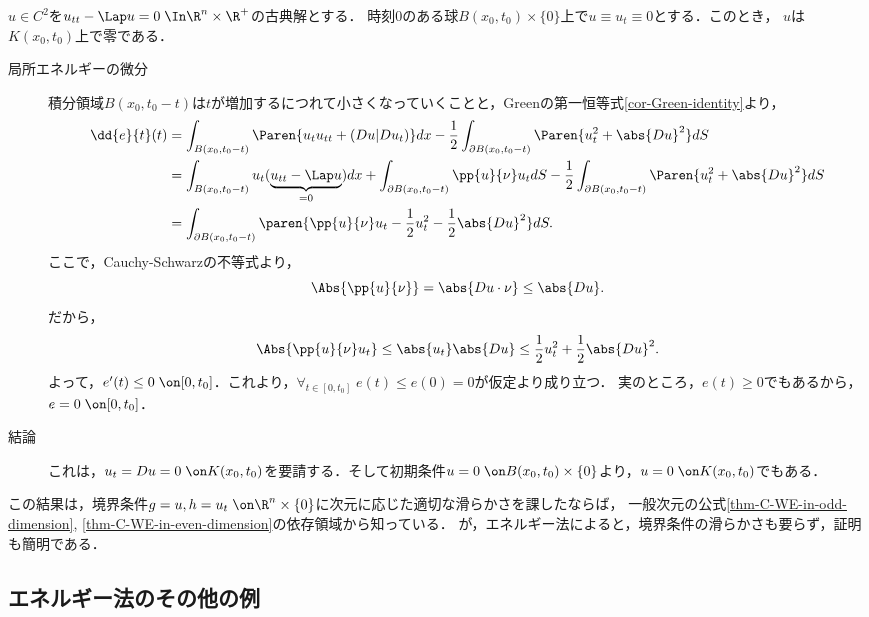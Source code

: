 \documentclass[uplatex,dvipdfmx]{jsreport}
\begin{document}
\begin{theorem}[波動方程式の解の有限伝播速度]
    $u\in C^2$を$u_{tt}-\Lap u=0\;\In \R^n\times\R^+$の古典解とする．
    時刻$0$のある球$B(x_0,t_0)\times\{0\}$上で$u\equiv u_t\equiv 0$とする．このとき，
    $u$は$K(x_0,t_0)$上で零である．
\end{theorem}
\begin{Proof}\mbox{}
    \begin{description}
        \item[局所エネルギーの微分] 積分領域$B(x_0,t_0-t)$は$t$が増加するにつれて小さくなっていくことと，Greenの第一恒等式\ref{cor-Green-identity}より，
        \begin{align*}
            \dd{e}{t}(t)&=\int_{B(x_0,t_0-t)}\Paren{u_tu_{tt}+(Du|Du_t)}dx-\frac{1}{2}\int_{\partial B(x_0,t_0-t)}\Paren{u_t^2+\abs{Du}^2}dS\\
            &=\int_{B(x_0,t_0-t)}u_t(\underbrace{u_{tt}-\Lap u}_{=0})dx+\int_{\partial B(x_0,t_0-t)}\pp{u}{\nu}u_tdS-\frac{1}{2}\int_{\partial B(x_0,t_0-t)}\Paren{u_t^2+\abs{Du}^2}dS\\
            &=\int_{\partial B(x_0,t_0-t)}\paren{\pp{u}{\nu}u_t-\frac{1}{2}u_t^2-\frac{1}{2}\abs{Du}^2}dS.
        \end{align*}
        ここで，Cauchy-Schwarzの不等式より，
        \[\Abs{\pp{u}{\nu}}=\abs{Du\cdot \nu}\le\abs{Du}.\]
        だから，
        \[\Abs{\pp{u}{\nu}u_t}\le\abs{u_t}\abs{Du}\le\frac{1}{2}u_t^2+\frac{1}{2}\abs{Du}^2.\]
        よって，$e'(t)\le0\;\on[0,t_0]$．これより，$\forall_{t\in[0,t_0]}\;e(t)\le e(0)=0$が仮定より成り立つ．
        実のところ，$e(t)\ge0$でもあるから，$e=0\;\on[0,t_0]$．
        \item[結論] これは，$u_t=Du=0\;\on K(x_0,t_0)$を要請する．そして初期条件$u=0\;\on B(x_0,t_0)\times\{0\}$より，$u=0\;\on K(x_0,t_0)$でもある．
    \end{description}
\end{Proof}
\begin{remarks}
    この結果は，境界条件$g=u,h=u_t\;\on\R^n\times\{0\}$に次元に応じた適切な滑らかさを課したならば，
    一般次元の公式\ref{thm-C-WE-in-odd-dimension}, \ref{thm-C-WE-in-even-dimension}の依存領域から知っている．
    が，エネルギー法によると，境界条件の滑らかさも要らず，証明も簡明である．
\end{remarks}

\subsection{エネルギー法のその他の例}
\end{document}
